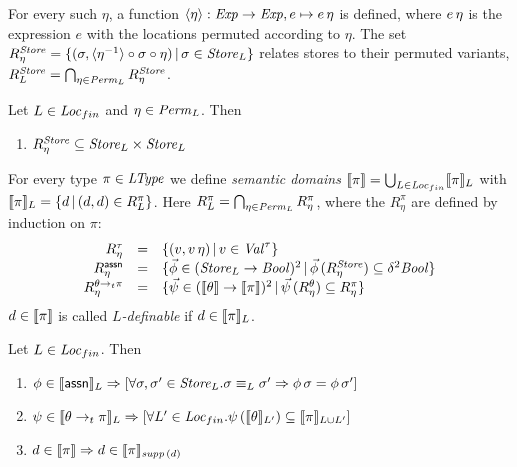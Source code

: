 \documentclass[12pt,a4paper]{report}
\begin{document}
For every such $\eta$, a function $\langle\eta\rangle:\mathit{Exp}\to\mathit{Exp},e\mapsto e\,\eta$ is
defined, where $e\,\eta$ is the expression $e$ with the locations permuted according to $\eta$.
The set
$R_\eta^{\mathit{Store}} = \{(\sigma,\langle\eta^{-1}\rangle \circ \sigma \circ \eta)\,|\,\sigma\in\mathit{Store}_L\}$
relates stores to their permuted variants, $R_L^{\mathit{Store}} = \bigcap_{\eta\in\mathit{Perm}_L} R_\eta^{\mathit{Store}}$.

\begin{lemma}
  Let $L\in\mathit{Loc}_{fin}$ and $\eta\in\mathit{Perm}_L$. Then
  \begin{enumerate}
    \item $R_\eta^{\mathit{Store}} \subseteq \mathit{Store}_L \times \mathit{Store}_L$
  \end{enumerate}
\end{lemma}

\begin{definition}
  For every type $\pi \in \mathit{LType}$ we define {\em semantic domains}
  $\llbracket\pi\rrbracket = \bigcup_{L\in\mathit{Loc}_{fin}} \llbracket\pi\rrbracket_L$ with
  $\llbracket\pi\rrbracket_L = \{d\,|\,(d,d)\in R_L^\pi\}$. Here
  $R_L^\pi = \bigcap_{\eta\in\mathit{Perm}_L} R_\eta^\pi$, where the $R_\eta^\pi$
  are defined by induction on $\pi$:
  \[\begin{array}{rcl}
    R_\eta^\tau &=& \{(v,v\,\eta)\,|\,v \in \mathit{Val}^\tau\} \\

    R_\eta^{\mathsf{assn}} &=& \{\vec{\phi}\in(\mathit{Store}_L\to\mathit{Bool})^2\,|\,\vec{\phi}\,(R_\eta^{\mathit{Store}}) \subseteq \delta^2 \mathit{Bool}\} \\

    R_\eta^{\theta\rightarrow_t\pi} &=& \{\vec{\psi}\in(\llbracket\theta\rrbracket\to\llbracket\pi\rrbracket)^2\,|\,
                                        \vec{\psi}\,(R_\eta^\theta) \subseteq R_\eta^\pi\}
  \end{array}\]
  $d \in \llbracket\pi\rrbracket$ is called {\em $L$-definable} if $d \in \llbracket\pi\rrbracket_L$.
\end{definition}

\begin{lemma}
  Let $L\in\mathit{Loc}_{fin}$. Then
  \begin{enumerate}
    \item $\phi\in\llbracket\mathsf{assn}\rrbracket_L \Rightarrow \left[ \forall \sigma,\sigma'\in\mathit{Store}_L.
              \sigma \equiv_L \sigma' \Rightarrow \phi\,\sigma = \phi\,\sigma'\right]$
    \item $\psi\in\llbracket\theta\rightarrow_t\pi\rrbracket_L \Rightarrow
              \left[\forall L'\in\mathit{Loc}_{fin}. \psi\,(\llbracket\theta\rrbracket_{L'})\subseteq\llbracket\pi\rrbracket_{L \cup L'} \right]$
    \item $d \in \llbracket\pi\rrbracket \Rightarrow d \in \llbracket\pi\rrbracket_{\mathit{supp}\,(d)}$
  \end{enumerate}
\end{lemma}
\end{document}
